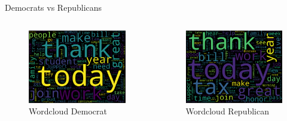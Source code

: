 \documentclass[aspectratio=169,xcolor=dvipsnames]{beamer}
\begin{document}
\begin{frame}{Democrats vs Republicans}
    \vspace*{-5mm}
    \begin{columns}
        \hspace{-5mm}
        \begin{column}{.7\textwidth}
            \begin{figure}
                \centering
                \includegraphics[width=.75\linewidth]{images/dem_wordcloud_full.png}
                \caption{Wordcloud Democrat}
                \label{fig:dem_wordcloud_full}
            \end{figure}
        \end{column}
        \hspace*{-2cm}
       \begin{column}{.7\textwidth}
            \begin{figure}
                \centering
                \includegraphics[width=.75\linewidth]{images/rep_wordcloud_full.png}
                \caption{Wordcloud Republican}
                \label{fig:rep_wordcloud_full}
            \end{figure}
        \end{column}
    \end{columns}
\end{frame}
\end{document}
